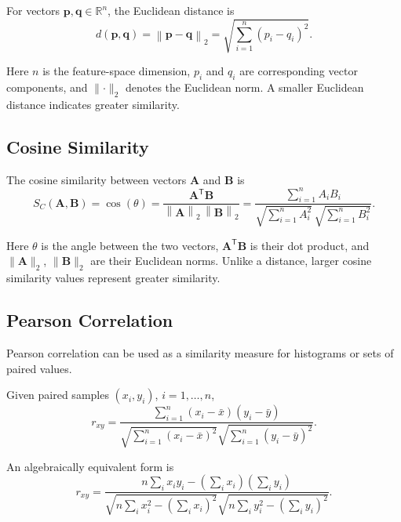 \documentclass[11pt,a4paper,oneside]{report}
\newcommand{\R}{\mathbb{R}}
\newcommand{\norm}[1]{\left\lVert #1 \right\rVert}
\begin{document}
For vectors
\(
\mathbf{p},\mathbf{q}\in\R^n
\),
the Euclidean distance is
\begin{equation}
d(\mathbf{p},\mathbf{q})
=
\norm{\mathbf{p}-\mathbf{q}}_2
=
\sqrt{
\sum_{i=1}^{n}
(p_i-q_i)^2
}.
\label{eq:euclidean}
\end{equation}

Here \(n\) is the feature-space dimension, \(p_i\) and \(q_i\) are
corresponding vector components, and \(\lVert\cdot\rVert_2\) denotes the
Euclidean norm. A smaller Euclidean distance indicates greater similarity.

\subsection{Cosine Similarity}

The cosine similarity between vectors
\(
\mathbf{A}
\)
and
\(
\mathbf{B}
\)
is
\begin{equation}
S_C(\mathbf{A},\mathbf{B})
=
\cos(\theta)
=
\frac{
\mathbf{A}^{\mathsf T}\mathbf{B}
}{
\norm{\mathbf{A}}_2\,\norm{\mathbf{B}}_2
}
=
\frac{
\sum_{i=1}^{n} A_iB_i
}{
\sqrt{\sum_{i=1}^{n}A_i^2}\,
\sqrt{\sum_{i=1}^{n}B_i^2}
}.
\label{eq:cosine}
\end{equation}

Here \(\theta\) is the angle between the two vectors,
\(\mathbf{A}^{\mathsf T}\mathbf{B}\) is their dot product, and
\(\lVert\mathbf{A}\rVert_2\), \(\lVert\mathbf{B}\rVert_2\) are their
Euclidean norms. Unlike a distance, larger cosine similarity values represent
greater similarity.

\subsection{Pearson Correlation}

Pearson correlation can be used as a similarity measure for histograms
or sets of paired values.

Given paired samples
\(
(x_i,y_i)
\),
\(i=1,\ldots,n\),
\begin{equation}
r_{xy}
=
\frac{
\sum_{i=1}^{n}
(x_i-\bar{x})(y_i-\bar{y})
}{
\sqrt{
\sum_{i=1}^{n}(x_i-\bar{x})^2
}
\sqrt{
\sum_{i=1}^{n}(y_i-\bar{y})^2
}
}.
\label{eq:pearson-centered}
\end{equation}

An algebraically equivalent form is
\begin{equation}
r_{xy}
=
\frac{
n\sum_i x_i y_i
-
\left(\sum_i x_i\right)
\left(\sum_i y_i\right)
}{
\sqrt{
n\sum_i x_i^2
-
\left(\sum_i x_i\right)^2
}
\sqrt{
n\sum_i y_i^2
-
\left(\sum_i y_i\right)^2
}
}.
\label{eq:pearson-raw}
\end{equation}
\end{document}
